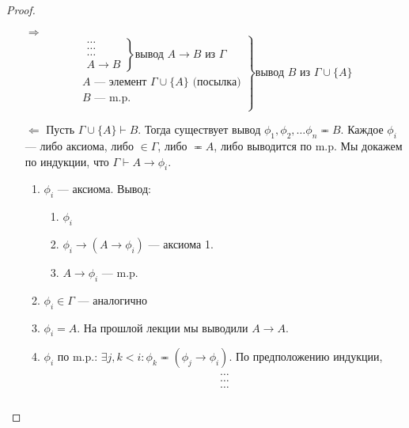 \begin{proof}\indent
    \begin{enumerate}
        \item[$\Rightarrow$] $$\left.\begin{array}{l}
           \left.\begin{array}{c}
            \dots  \\
            \dots  \\
            \dots  \\
            A \rightarrow B
        \end{array}\right\}\text{вывод  $A\rightarrow B$ из $\Gamma$}  \\
            A\text{ --- элемент $\Gamma \cup \{A\}$ (посылка)} \\
            B\text{ --- m.p.} \\
        \end{array}\right\}\text{вывод $B$ из $\Gamma \cup \{A\}$}$$
        \item[$\Leftarrow$] Пусть $ \Gamma \cup \{A\} \vdash B$. Тогда существует вывод $\phi_1, \phi_2, \dots \phi_n \eqcirc B$. Каждое $\phi_i$ --- либо аксиома, либо $\in \Gamma$, либо $\eqcirc A$, либо выводится по m.p. Мы докажем по индукции, что $\Gamma \vdash A \rightarrow \phi_i$.
        \begin{enumerate}
            \item $\phi_i$ --- аксиома. Вывод:
                \begin{enumerate}
                    \item $\phi_i$
                    \item $\phi_i \rightarrow (A \rightarrow \phi_i)$ --- аксиома 1.
                    \item $A \rightarrow \phi_i$ --- m.p.
                \end{enumerate}
            \item $\phi_i \in \Gamma$ --- аналогично
            \item $\phi_i = A$. На прошлой лекции мы выводили $A \rightarrow A$.
            \item $\phi_i$ по m.p.: $\exists j, k < i: \phi_k \eqcirc (\phi_j \rightarrow \phi_i)$. По предположению индукции, 
            $$\left.\begin{array}{l}
           \left.\begin{array}{c}
            \dots  \\
            \dots  \\
            \dots  \\

\end{array}
\end{array}$$
\end{enumerate}
\end{enumerate}
\end{proof}
